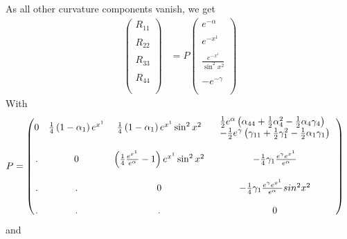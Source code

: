 As all other curvature components vanish, we get
\begin{align}
\begin{pmatrix}
 R_{11}\\\\
 R_{22}\\\\
 R_{33}\\\\
 R_{44}\\\\
\end{pmatrix}&=P
\begin{pmatrix}
 {e^{-\alpha}}\\\\
 {e^{-x^1}}\\\\
 \frac{e^{-x^1}}{\sin^2 x^2}\\\\
 -{e^{-\gamma}}\\\\
\end{pmatrix}
\end{align}
With
\begin{align}
 P&=
\begin{pmatrix}
 0&\frac{1}{4} \left(1-\alpha _1 \right) e^{x^1} & \frac{1}{4}\left(1-\alpha _1 \right) e^{x^1}\sin^2 x^2 & \left. \begin{array}{l}
\frac{1}{2} e^{\alpha} \left(\alpha_{44}  + \frac{1}{2}\alpha_{4}^2 
- \frac{1}{2} \alpha _4\gamma _4  \right) \\ -\frac{1}{2} e^{\gamma} \left(\gamma_{11} +\frac{1}{2}\gamma_{1}^2 
-  \frac{1}{2} \alpha _1\gamma _1  
\right)
\end{array}\right. \\\\
  .& 0 &  \left(\frac{1}{4}\frac{e^{x^1}}{e^{\alpha}}-1 \right)e^{x^1}\sin^2 x^2& -\frac{1}{4} \gamma _1  \frac{e^{\gamma}e^{x^1}}{e^{\alpha}} \\\\
 . & . & 0 & -\frac{1}{4} \gamma _1  \frac{e^{\gamma}e^{x^1}}{e^{\alpha}}sin^2 x^2 \\\\
 . &  . &. & 0 \\
\end{pmatrix}
\end{align}
and
